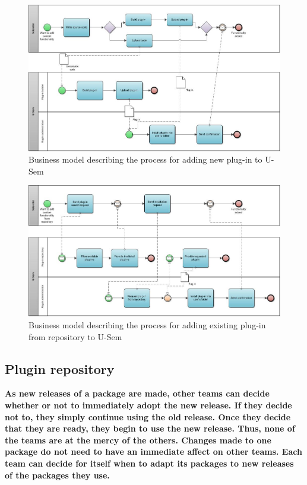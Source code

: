 \begin{figure}[h!]
  \centering
  	\includegraphics[scale=0.5]{plug-in/AddNewPluginBusinessModel.jpg}
  \caption{Business model describing the process for adding new plug-in to U-Sem}
\end{figure}

\begin{figure}[h!]
  \centering
  	\includegraphics[scale=0.5]{plug-in/AddPlugInFromRepoBusinessModel.jpg}
  \caption{Business model describing the process for adding existing plug-in from repository to U-Sem}
\end{figure}

\subsection{Plugin repository}
\textbf{As new releases of a package are made, other teams can decide whether or not to
immediately adopt the new release. If they decide not to, they simply continue using the
old release. Once they decide that they are ready, they begin to use the new release.
Thus, none of the teams are at the mercy of the others. Changes made to one package
do not need to have an immediate affect on other teams. Each team can decide for itself
when to adapt its packages to new releases of the packages they use.}

